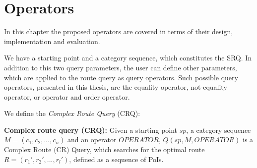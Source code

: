 \chapter{Operators} 
\label{sec:operators}

In this chapter the proposed operators are covered in terms of their design, implementation and evaluation.

We have a starting point and a category sequence, which constitutes the SRQ. In addition to this two query parameters, the user can define other parameters, which are applied to the route query as query operators. Such possible query operators, presented in this thesis, are the equality operator, not-equality operator, or operator and order operator. 

We define the \textit{Complex Route Query} (CRQ):

\textbf{Complex route query (CRQ):} Given a starting point $sp$, a category sequence $M = (c_1, c_2, ..., c_n)$ and an operator $OPERATOR$, $Q(sp, M, OPERATOR)$ is a Complex Route (CR) Query, which searches for the optimal route $R = (r_1', r_2', ..., r_l')$, defined as a sequence of PoIs.
